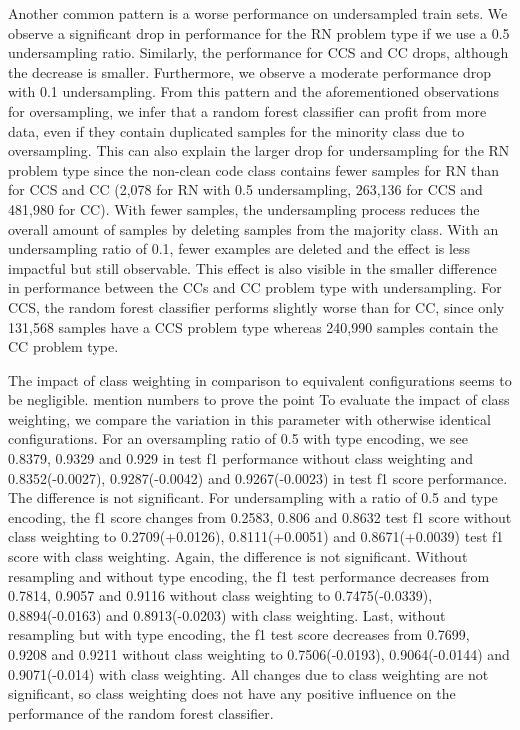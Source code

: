 Another common pattern is a worse performance on undersampled train sets. We observe a significant drop in performance for the RN problem type if we use a 0.5 undersampling ratio. Similarly, the performance for CCS and CC drops, although the decrease is smaller. Furthermore, we observe a moderate performance drop with 0.1 undersampling. From this pattern and the aforementioned observations for oversampling, we infer that a random forest classifier can profit from more data, even if they contain duplicated samples for the minority class due to oversampling. This can also explain the larger drop for undersampling for the RN problem type since the non-clean code class contains fewer samples for RN than for CCS and CC (2,078 for RN with 0.5 undersampling, 263,136 for CCS and 481,980 for CC). With fewer samples, the undersampling process reduces the overall amount of samples by deleting samples from the majority class. With an undersampling ratio of 0.1, fewer examples are deleted and the effect is less impactful but still observable. This effect is also visible in the smaller difference in performance between the CCs and CC problem type with undersampling. For CCS, the random forest classifier performs slightly worse than for CC, since only 131,568 samples have a CCS problem type whereas 240,990 samples contain the CC problem type.

The impact of class weighting in comparison to equivalent configurations seems to be negligible. 
mention numbers to prove the point
To evaluate the impact of class weighting, we compare the variation in this parameter with otherwise identical configurations.
For an oversampling ratio of 0.5 with type encoding, we see 0.8379, 0.9329 and 0.929 in test f1 performance without class weighting and 0.8352(-0.0027), 0.9287(-0.0042) and 0.9267(-0.0023) in test f1 score performance. The difference is not significant.
For undersampling with a ratio of 0.5 and type encoding, the f1 score changes from 0.2583, 0.806 and 0.8632 test f1 score without class weighting to 0.2709(+0.0126), 0.8111(+0.0051) and 0.8671(+0.0039) test f1 score with class weighting. Again, the difference is not significant.
Without resampling and without type encoding, the f1 test performance decreases from 0.7814, 0.9057 and 0.9116 without class weighting to 0.7475(-0.0339), 0.8894(-0.0163) and 0.8913(-0.0203) with class weighting.
Last, without resampling but with type encoding, the f1 test score decreases from 0.7699, 0.9208 and 0.9211 without class weighting to 0.7506(-0.0193), 0.9064(-0.0144) and 0.9071(-0.014) with class weighting.
All changes due to class weighting are not significant, so class weighting does not have any positive influence on the performance of the random forest classifier.


